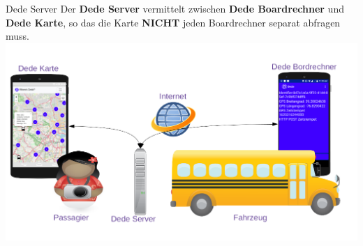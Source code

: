 
\begin{frame}{Dede Server}
  Der \textbf{Dede Server} vermittelt zwischen \textbf{Dede Boardrechner} und \textbf{Dede Karte}, so das die Karte \textbf{NICHT} jeden Boardrechner separat abfragen muss.
  \includegraphics[width=\paperwidth]{dede/dede-concept}
\end{frame}
